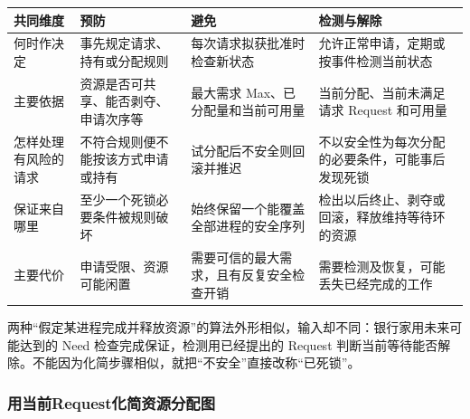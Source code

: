 \begin{wideblock}

\par\medskip\noindent\begin{minipage}{\linewidth}\fontsize{9.3}{12}\selectfont\begin{tabularx}{\linewidth}{@{}YYYY@{}}
\toprule\noalign{}
\begin{minipage}[b]{\linewidth}\raggedright
共同维度
\end{minipage} & \begin{minipage}[b]{\linewidth}\raggedright
预防
\end{minipage} & \begin{minipage}[b]{\linewidth}\raggedright
避免
\end{minipage} & \begin{minipage}[b]{\linewidth}\raggedright
检测与解除
\end{minipage} \\
\midrule\noalign{}


何时作决定 & 事先规定请求、持有或分配规则 & 每次请求拟获批准时检查新状态 & 允许正常申请，定期或按事件检测当前状态 \\
主要依据 & 资源是否可共享、能否剥夺、申请次序等 & 最大需求 Max、已分配量和当前可用量 & 当前分配、当前未满足请求 Request 和可用量 \\
怎样处理有风险的请求 & 不符合规则便不能按该方式申请或持有 & 试分配后不安全则回滚并推迟 & 不以安全性为每次分配的必要条件，可能事后发现死锁 \\
保证来自哪里 & 至少一个死锁必要条件被规则破坏 & 始终保留一个能覆盖全部进程的安全序列 & 检出以后终止、剥夺或回滚，释放维持等待环的资源 \\
主要代价 & 申请受限、资源可能闲置 & 需要可信的最大需求，且有反复安全检查开销 & 需要检测及恢复，可能丢失已经完成的工作 \\
\bottomrule\end{tabularx}
\end{minipage}\par\medskip

\end{wideblock}

两种``假定某进程完成并释放资源''的算法外形相似，输入却不同：银行家用未来可能达到的 Need 检查完成保证，检测用已经提出的 Request 判断当前等待能否解除。不能因为化简步骤相似，就把``不安全''直接改称``已死锁''。

\subsubsection{用当前Request化简资源分配图}\label{OS02-deadlock-detection}

